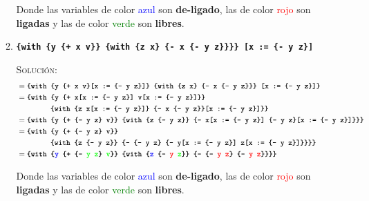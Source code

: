 \documentclass[letterpaper,11pt]{article}
\begin{document}
\begin{enumerate}
\begin{enumerate}
        Donde las variables de color \textcolor{blue}{azul} son \textbf{de-ligado},
        las de color \textcolor{red}{rojo} son \textbf{ligadas} y las de color 
        \textcolor{green}{verde} son \textbf{libres}.

        \item \texttt{\textbf{\{with \{y \{+ x v\}\} \{with \{z x\} 
        \{- x \{- y z\}\}\}\} [x := \{- y z\}]}}

        \textsc{Solución:}
        \begin{align*}
            &= \texttt{\textbf{\{with \{y \{+ x v\}[x := \{- y z\}]\} 
                                      \{with \{z x\} \{- x \{- y z\}\}\}
                                      [x := \{- y z\}]\}}} \\
            &= \texttt{\textbf{\{with \{y \{+ x[x := \{- y z\}] v[x := \{- y z\}]\}\}}} \\
            &\; \; \; \; \; \; \; \; \; \; \; \; \; \; \; \; 
            \texttt{\textbf{\{with \{z x[x := \{- y z\}]\} 
                                   \{- x \{- y z\}\}[x := \{- y z\}]\}\}}} \\
            &= \texttt{\textbf{\{with \{y \{+ \{- y z\} v\}\} 
                                      \{with \{z \{- y z\}\} 
                                             \{- x[x := \{- y z\}] 
                                             \{- y z\}[x := \{- y z\}]\}\}\}}} \\
            &= \texttt{\textbf{\{with \{y \{+ \{- y z\} v\}\}}} \\
            &\; \; \; \; \; \; \; \; \; \; \; \; \; \; \; \; 
            \texttt{\textbf{\{with \{z \{- y z\}\} 
                                             \{- \{- y z\}
                                             \{- y[x := \{- y z\}] z[x := \{- y z\}]\}\}\}\}}} \\
            &= \texttt{\textbf{\{with \{\textcolor{blue}{y} 
            \{+ \{- \textcolor{green}{y} \textcolor{green}{z}\} \textcolor{green}{v}\}\} 
            \{with \{\textcolor{blue}{z} \{- \textcolor{red}{y} \textcolor{green}{z}\}\} 
            \{- \{- \textcolor{red}{y} \textcolor{red}{z}\} \{- \textcolor{red}{y} 
            \textcolor{red}{z}\}\}\}\}}}
        \end{align*}

        Donde las variables de color \textcolor{blue}{azul} son \textbf{de-ligado},
        las de color \textcolor{red}{rojo} son \textbf{ligadas} y las de color 
        \textcolor{green}{verde} son \textbf{libres}.
        

\end{enumerate}
\end{enumerate}
\end{document}
